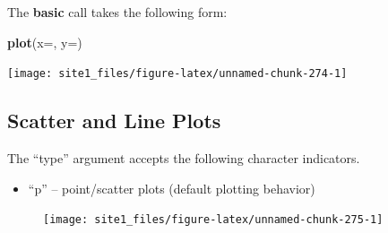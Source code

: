 \documentclass[]{book}
\newenvironment{Shaded}{\begin{snugshade}}{\end{snugshade}}
\newcommand{\KeywordTok}[1]{\textcolor[rgb]{0.13,0.29,0.53}{\textbf{#1}}}
\newcommand{\DataTypeTok}[1]{\textcolor[rgb]{0.13,0.29,0.53}{#1}}
\newcommand{\StringTok}[1]{\textcolor[rgb]{0.31,0.60,0.02}{#1}}
\newcommand{\OperatorTok}[1]{\textcolor[rgb]{0.81,0.36,0.00}{\textbf{#1}}}
\newcommand{\NormalTok}[1]{#1}
\providecommand{\tightlist}{%
  \setlength{\itemsep}{0pt}\setlength{\parskip}{0pt}}
\begin{document}
The \textbf{basic} call takes the following form:

\begin{Shaded}
\begin{Highlighting}[]
\KeywordTok{plot}\NormalTok{(}\DataTypeTok{x=}\NormalTok{, }\DataTypeTok{y=}\NormalTok{)}
\end{Highlighting}
\end{Shaded}

\begin{Shaded}
\end{Shaded}

\begin{center}\texttt{[image: site1\_files/figure-latex/unnamed-chunk-274-1]} \end{center}

\subsection{Scatter and Line Plots}\label{scatter-and-line-plots}

The ``type'' argument accepts the following character indicators.

\begin{itemize}
\tightlist
\item
  ``p'' -- point/scatter plots (default plotting behavior)
\end{itemize}

\begin{Shaded}
\end{Shaded}

\begin{figure}

{\centering \texttt{[image: site1\_files/figure-latex/unnamed-chunk-275-1]} 

}

\caption{ }\label{fig:unnamed-chunk-275}
\end{figure}
\end{document}
